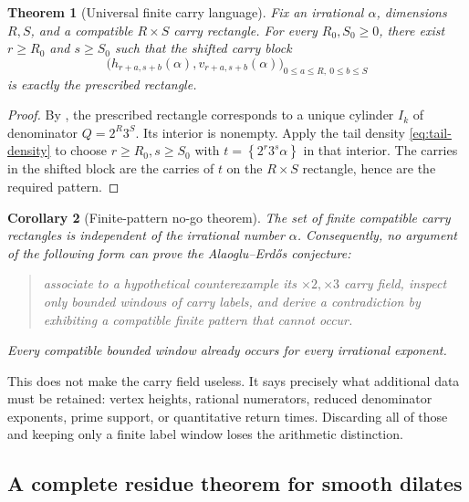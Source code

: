 \documentclass[11pt]{article}
\newtheorem{theorem}{Theorem}[section]
\newtheorem{corollary}[theorem]{Corollary}
\theoremstyle{definition}
\theoremstyle{remark}
\newcommand{\fract}[1]{\left\{#1\right\}}
\begin{document}
\begin{theorem}[Universal finite carry language]\label{thm:universal-language}
Fix an irrational $\alpha$, dimensions $R,S$, and a compatible $R\times S$ carry
rectangle.  For every $R_0,S_0\ge0$, there exist $r\ge R_0$ and $s\ge S_0$ such that
the shifted carry block
\begin{equation}\label{eq:shifted-block}
 \bigl(h_{r+a,s+b}(\alpha),v_{r+a,s+b}(\alpha)\bigr)_{
 0\le a\le R,\ 0\le b\le S}
\end{equation}
is exactly the prescribed rectangle.
\end{theorem}

\begin{proof}
By , the prescribed rectangle corresponds to a unique
cylinder $I_k$ of denominator $Q=2^R3^S$.  Its interior is nonempty.  Apply the tail
density \eqref{eq:tail-density} to choose $r\ge R_0,s\ge S_0$ with
$t=\fract{2^r3^s\alpha}$ in that interior.  The carries in the shifted block are the
carries of $t$ on the $R\times S$ rectangle, hence are the required pattern.
\end{proof}

\begin{corollary}[Finite-pattern no-go theorem]\label{cor:finite-pattern-nogo}
The set of finite compatible carry rectangles is independent of the irrational
number $\alpha$.  Consequently, no argument of the following form can prove the
Alaoglu--Erd\H{o}s conjecture:
\begin{quote}
associate to a hypothetical counterexample its $\times2,\times3$ carry field, inspect
only bounded windows of carry labels, and derive a contradiction by exhibiting a
compatible finite pattern that cannot occur.
\end{quote}
Every compatible bounded window already occurs for every irrational exponent.
\end{corollary}

This does not make the carry field useless.  It says precisely what additional data
must be retained: vertex heights, rational numerators, reduced denominator exponents,
prime support, or quantitative return times.  Discarding all of those and keeping
only a finite label window loses the arithmetic distinction.

\subsection{A complete residue theorem for smooth dilates}
\end{document}
